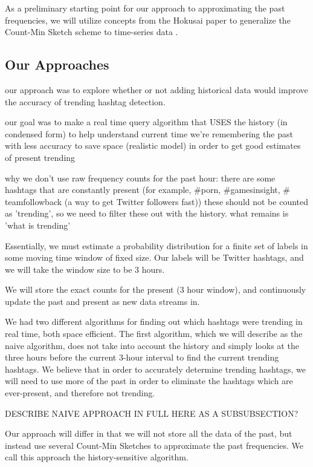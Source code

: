 \documentclass[twoside]{article}
\newcommand{\cc}[1]
 {\textbf{\cite{#1}}}
\begin{document}
As a preliminary starting point for our approach to approximating the past frequencies, we will utilize concepts from the Hokusai paper to generalize the Count-Min Sketch scheme to time-series data \cc{Matusevych:2012}. 

\subsection{Our Approaches}

our approach was to explore whether or not adding historical data would improve the accuracy of 
trending hashtag detection.

our goal was to make a real time query algorithm that USES
the history (in condensed form) to help understand current time 
we're remembering the past with less accuracy to save space (realistic model)
in order to get good estimates of present trending

why we don't use raw frequency counts for the past hour:
there are some hashtags that are constantly present (for example, $\#$porn, $\#$gamesinsight, $\#$teamfollowback (a way to get Twitter followers fast))
these should not be counted as 'trending', so we need to filter these out
with the history. what remains is 'what is trending'

Essentially, we must estimate a probability distribution for a finite set of labels in some moving time window of fixed size. Our labels will be Twitter hashtags, and we will take the window size to be 3 hours.

We will store the exact counts for the present (3 hour window), and continuously update the past and present as new data streams in. 

We had two different algorithms for finding out which hashtags were trending in real time, both space efficient.
The first algorithm, which we will describe as the naive algorithm, does not take into account the history and simply looks at the three hours before the current $3$-hour interval to find the current trending hashtags. We believe that in order to accurately determine trending hashtags, we will need to use more of the past in order to eliminate the hashtags which are ever-present, and therefore not trending. 

DESCRIBE NAIVE APPROACH IN FULL HERE AS A SUBSUBSECTION? 

Our approach will differ in that we will not store all the data of the past, but instead use several Count-Min Sketches to approximate the past frequencies. We call this approach the history-sensitive algorithm.
\end{document}
